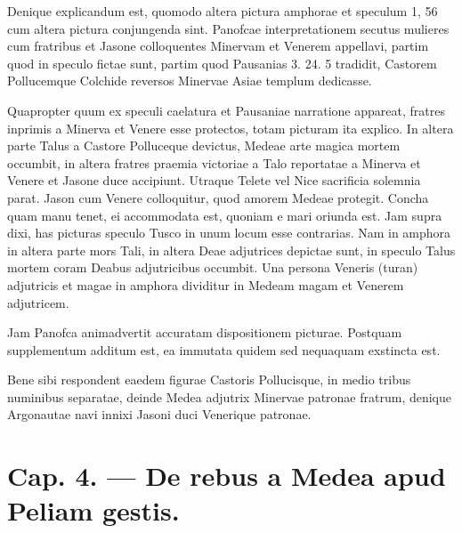 \documentclass[a4paper, 11pt, oneside, polutonikogreek, german]{article}
\begin{document}
Denique explicandum est, quomodo altera pictura amphorae et speculum 1, 56 cum altera pictura conjungenda sint. Panofcae interpretationem secutus mulieres cum fratribus et Jasone colloquentes Minervam et Venerem appellavi, partim quod in speculo fictae sunt, partim quod Pausanias 3. 24. 5 tradidit, Castorem Pollucemque Colchide reversos Minervae Asiae templum dedicasse.

Quapropter quum ex speculi caelatura et Pausaniae narratione appareat, fratres inprimis a Minerva et Venere esse protectos, totam picturam ita explico. In altera parte Talus a Castore Polluceque devictus, Medeae arte magica mortem occumbit, in altera fratres praemia victoriae a Talo reportatae a Minerva et Venere et Jasone duce accipiunt. Utraque Telete vel Nice sacrificia solemnia parat. Jason cum Venere colloquitur, quod amorem Medeae protegit. Concha quam manu tenet, ei accommodata est, quoniam e mari oriunda est. Jam supra dixi, has picturas speculo Tusco in unum locum esse contrarias. Nam in amphora in altera parte mors Tali, in altera Deae adjutrices depictae sunt, in speculo Talus mortem coram Deabus adjutricibus occumbit. Una persona Veneris (turan) adjutricis et magae in amphora dividitur in Medeam magam et Venerem adjutricem.

Jam Panofca animadvertit accuratam dispositionem picturae. Postquam supplementum additum est, ea immutata quidem sed nequaquam exstincta est.

Bene sibi respondent eaedem figurae Castoris Pollucisque, in medio tribus numinibus separatae, deinde Medea adjutrix Minervae patronae fratrum, denique Argonautae navi innixi Jasoni duci Venerique patronae.
\clearpage
\section{Cap. 4. --- De rebus a Medea apud Peliam gestis.}
\end{document}
